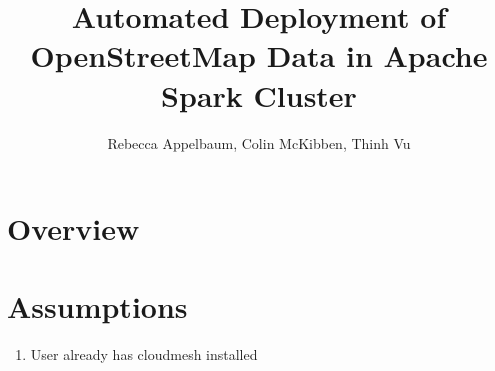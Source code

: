 \documentclass[12pt]{article}
\begin{document}
\title{Automated Deployment of OpenStreetMap Data in Apache Spark Cluster}
\author{Rebecca Appelbaum, Colin McKibben, Thinh Vu}
\maketitle

\section{Overview}


\section{Assumptions}
\begin{enumerate}
\item User already has cloudmesh installed
\end{enumerate}
\end{document}
